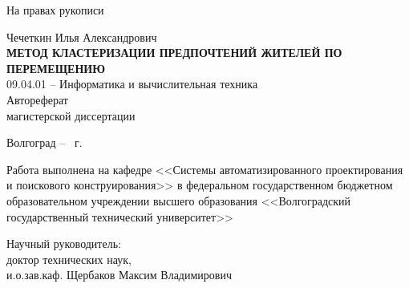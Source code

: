 \documentclass[a4paper, 14pt]{extreport}
\begin{document}
    \begin{titlepage}
        \hspace{20em}На правах рукописи\\
        \begin{center}
            \vspace{8em}Чечеткин Илья Александрович\\
            \large\vspace{2em}\textbf{\MakeUppercase{Метод кластеризации предпочтений жителей по перемещению}}\normalsize\\
            \vspace{8em}09.04.01 -- Информатика и вычислительная техника\\
            \vspace{8em}Автореферат\\магистерской диссертации
        \end{center}
        \vfill
        \begin{center}
            Волгоград -- \the\year\ г.
        \end{center}
        \newpage
        \thispagestyle{empty}
        Работа выполнена на кафедре <<Системы автоматизированного проектирования и поискового 
        конструирования>> в федеральном государственном бюджетном образовательном учреждении
        высшего образования <<Волгоградский государственный технический университет>>\\
        \vspace{3em}\begin{flushleft}
            Научный руководитель:\\
            \hspace{4cm}доктор технических наук,\\
            \hspace{4cm}и.о.зав.каф. Щербаков Максим Владимирович\\
        \end{flushleft}
    \end{titlepage}
    \newpage
    \onehalfspacing
    \setcounter{page}{3}
    
\end{document}
